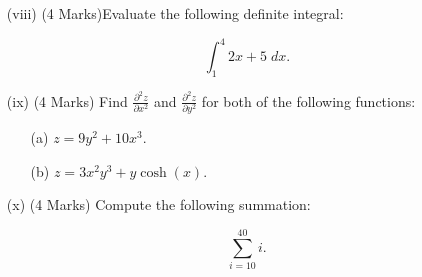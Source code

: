 ﻿ \documentclass[a4paper,12pt]{article}
\begin{document}
\begin{itemize}
\begin{multicols}{2}
\begin{itemize}
	\end{itemize}
	\end{multicols}

	\smallskip
	\item[(viii)] (4 Marks)Evaluate the following definite integral:
	
	\[  \int^{4}_{1}  2x+5\; dx.  \]
	\smallskip

	
%	
	
	
	\item[(ix)] (4 Marks) Find $\displaystyle{ \frac{ \partial^2 z }{ \partial x^2 }}$ and $\displaystyle{ \frac{ \partial^2 z }{ \partial y^2 }}$  for both of the following functions:
\smallskip
	\begin{multicols}{2}
		\begin{itemize}
			\item[(a)] $\displaystyle{  z = 9y^2 +10x^3. }  $
				\item[(b)] $\displaystyle{  z = 3x^2y^3 + y\cosh(x).}$
				
			\end{itemize}
		\end{multicols}
		\medskip
	\item[(x)] (4 Marks)  Compute the following summation:
	
	\[ \sum_{i=10}^{40} i . \]
\end{itemize}





	

	
%		
%
%
%		
%
\end{document}
